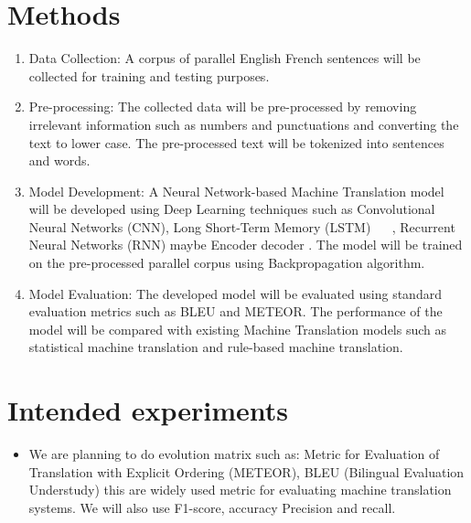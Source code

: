 \documentclass{article}
\begin{document}
\section{Methods}
\begin{enumerate}
    \item Data Collection: A corpus of parallel English French sentences will be collected for training and testing purposes.
    \item Pre-processing: The collected data will be pre-processed by removing irrelevant information such as numbers and punctuations and converting the text to lower case. The pre-processed text will be tokenized into sentences and words.
    \item Model Development: A Neural Network-based Machine Translation model will be developed using Deep Learning techniques such as Convolutional Neural Networks (CNN), Long Short-Term Memory (LSTM) ~\cite{yao2018improved} ~\cite{rahit2020machine}, Recurrent Neural Networks (RNN) maybe Encoder decoder . The model will be trained on the pre-processed parallel corpus using Backpropagation algorithm.
    \item Model Evaluation: The developed model will be evaluated using standard evaluation metrics such as BLEU and METEOR. The performance of the model will be compared with existing Machine Translation models such as statistical machine translation and rule-based machine translation.~\cite{zou2013bilingual}~\cite{rathod2014machine}
\end{enumerate}


\section{Intended experiments}
\begin{itemize}
    \item We are planning to do evolution matrix such as:  Metric for Evaluation of Translation with Explicit Ordering (METEOR), BLEU (Bilingual Evaluation Understudy) this are widely used metric for evaluating machine translation systems. We will also use F1-score, accuracy Precision and recall. ~\cite{liu2020auto}
\end{itemize}




\end{document}
